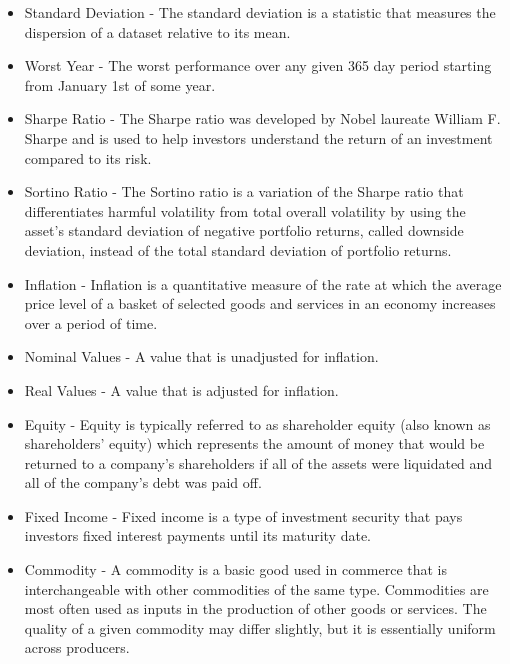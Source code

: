 \documentclass[main.tex]{subfiles}
\begin{document}
\begin{itemize}
    \item Standard Deviation - The standard deviation is a statistic that measures the dispersion of a dataset relative to its mean.
    \item Worst Year - The worst performance over any given 365 day period starting from January 1st of some year.
    \item Sharpe Ratio - The Sharpe ratio was developed by Nobel laureate William F. Sharpe and is used to help investors understand the return of an investment compared to its risk.
\item Sortino Ratio - The Sortino ratio is a variation of the Sharpe ratio that differentiates harmful volatility from total overall volatility by using the asset's standard deviation of negative portfolio returns, called downside deviation, instead of the total standard deviation of portfolio returns.
\item Inflation - Inflation is a quantitative measure of the rate at which the average price level of a basket of selected goods and services in an economy increases over a period of time.
\item Nominal Values - A value that is unadjusted for inflation.
\item Real Values - A value that is adjusted for inflation.
\item Equity - Equity is typically referred to as shareholder equity (also known as shareholders' equity) which represents the amount of money that would be returned to a company’s shareholders if all of the assets were liquidated and all of
the company's debt was paid off.
\item Fixed Income - Fixed income is a type of investment security that pays investors fixed interest payments until its maturity date.
\item Commodity - A commodity is a basic good used in commerce that is interchangeable with other commodities of the same type. Commodities are most often used as inputs in the production of other goods or services. The quality of a given commodity may differ slightly, but it is essentially uniform across producers.

\end{itemize}
\end{document}
